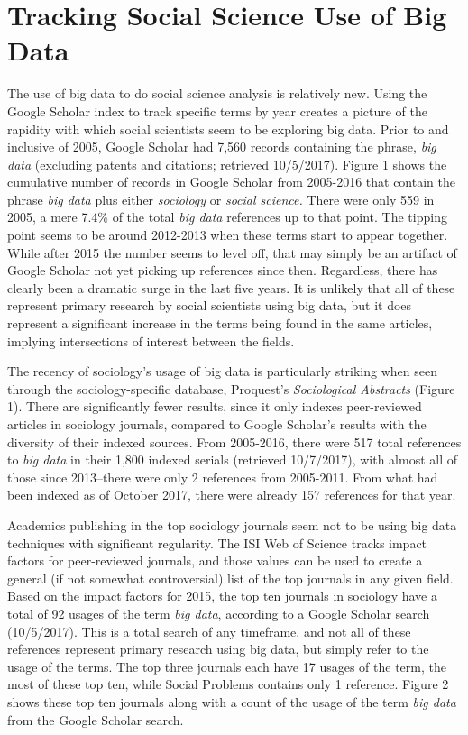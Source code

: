 \documentclass[sigconf]{acmart}
\begin{document}
\section{Tracking Social Science Use of Big Data}
The use of big data to do social science analysis is relatively new.  Using the Google Scholar index to track specific terms by year creates a picture of the rapidity with which social scientists seem to be exploring big data.  Prior to and inclusive of 2005, Google Scholar had 7,560 records containing the phrase, {\em big data} (excluding patents and citations; retrieved 10/5/2017).  Figure 1 shows the cumulative number of records in Google Scholar from 2005-2016 that contain the phrase {\em big data} plus either {\em sociology} or {\em social science.}  There were only 559 in 2005, a mere 7.4\% of the total {\em big data} references up to that point.  The tipping point seems to be around 2012-2013 when these terms start to appear together.  While after 2015 the number seems to level off, that may simply be an artifact of Google Scholar not yet picking up references since then.  Regardless, there has clearly been a dramatic surge in the last five years.  It is unlikely that all of these represent primary research by social scientists using big data, but it does represent a significant increase in the terms being found in the same articles, implying intersections of interest between the fields.    

The recency of sociology's usage of big data is particularly striking when seen through the sociology-specific database, Proquest's {\em Sociological Abstracts} (Figure 1). There are significantly fewer results, since it only indexes peer-reviewed articles in sociology journals, compared to Google Scholar's results with the diversity of their indexed sources.  From 2005-2016, there were 517 total references to {\em big data} in their 1,800 indexed serials (retrieved 10/7/2017), with almost all of those since 2013--there were only 2 references from 2005-2011.  From what had been indexed as of October 2017, there were already 157 references for that year.    

Academics publishing in the top sociology journals seem not to be using big data techniques with significant regularity.  The ISI Web of Science tracks impact factors for peer-reviewed journals, and those values can be used to create a general (if not somewhat controversial) list of the top journals in any given field.  Based on the impact factors for 2015, the top ten journals in sociology have a total of 92 usages of the term {\em big data}, according to a Google Scholar search (10/5/2017).  This is a total search of any timeframe, and not all of these references represent primary research using big data, but simply refer to the usage of the terms.   The top three journals each have 17 usages of the term, the most of these top ten, while Social Problems contains only 1 reference.  Figure 2 shows these top ten journals along with a count of the usage of the term {\em big data} from the Google Scholar search.  
\end{document}
